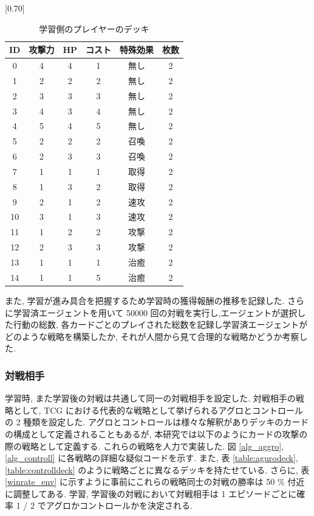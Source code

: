 \documentclass[12pt]{jarticle}
\begin{document}
\begin{table}[ht]
  \centering
  \caption{学習側のプレイヤーのデッキ}
  \label{table:OPdeck}
  \vspace{-0.3cm}
  \scalebox{0.70}[0.70]{
    \begin{tabular}{|c|c|c|c|c|c|}
      \hline
      ID & 攻撃力 & HP & コスト & 特殊効果 & 枚数 \\ \hline
      0 & 4 & 4 & 1 & 無し & 2 \\ \hline
      1 & 2 & 2 & 2 & 無し & 2 \\ \hline
      2 & 3 & 3 & 3 & 無し & 2 \\ \hline
      3 & 4 & 3 & 4 & 無し & 2 \\ \hline
      4 & 5 & 4 & 5 & 無し & 2 \\ \hline
      5 & 2 & 2 & 2 & 召喚 & 2 \\ \hline
      6 & 2 & 3 & 3 & 召喚 & 2 \\ \hline
      7 & 1 & 1 & 1 & 取得 & 2 \\ \hline
      8 & 1 & 3 & 2 & 取得 & 2 \\ \hline
      9 & 2 & 1 & 2 & 速攻 & 2 \\ \hline
      10 & 3 & 1 & 3 & 速攻 & 2 \\ \hline
      11 & 1 & 2 & 2 & 攻撃 & 2 \\ \hline
      12 & 2 & 3 & 3 & 攻撃 & 2 \\ \hline
      13 & 1 & 1 & 1 & 治癒 & 2 \\ \hline
      14 & 1 & 1 & 5 & 治癒 & 2 \\ \hline
      \end{tabular}
  }
  
  \end{table}
また, 学習が進み具合を把握するため学習時の獲得報酬の推移を記録した.
さらに学習済エージェントを用いて 50000 回の対戦を実行し,エージェントが選択した行動の総数, 各カードごとのプレイされた総数を記録し学習済エージェントがどのような戦略を構築したか, それが人間から見て合理的な戦略かどうか考察した.

\subsubsection{対戦相手}
学習時, また学習後の対戦は共通して同一の対戦相手を設定した. 
対戦相手の戦略として, TCG における代表的な戦略として挙げられるアグロとコントロールの 2 種類を設定した. アグロとコントロールは様々な解釈がありデッキのカードの構成として定義されることもあるが, 本研究では以下のようにカードの攻撃の際の戦略として定義する. これらの戦略を人力で実装した.  図 \ref{alg_aggro}, \ref{alg_controll} に各戦略の詳細な疑似コードを示す. また, 表 \ref{table:agurodeck}, \ref{table:controlldeck} のように戦略ごとに異なるデッキを持たせている. さらに, 表 \ref{winrate_env} に示すように事前にこれらの戦略同士の対戦の勝率は 50 \% 付近に調整してある. 学習, 学習後の対戦において対戦相手は 1 エピソードごとに確率 1 / 2 でアグロかコントロールかを決定される.
\end{document}

